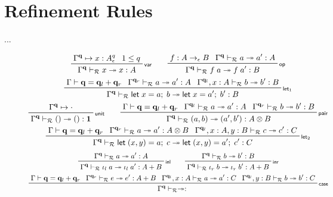 \documentclass[acmsmall,screen,review]{acmart}
\newcommand{\mc}[1]{\ensuremath{\mathcal{#1}}}
\newcommand{\mb}[1]{\ensuremath{\mathbf{#1}}}
\newcommand{\ms}[1]{\ensuremath{\mathsf{#1}}}
\newcommand{\linl}[1]{\iota_l\;{#1}}
\newcommand{\linr}[1]{\iota_r\;{#1}}
\newcommand{\letexpr}[3]{\ensuremath{\ms{let}\;#1 = #2;\;#3}}
\newcommand{\qsp}[4]{#1 \vdash #2 = #3 + #4}
\newcommand{\cwk}[2]{#1 \mapsto #2}
\newcommand{\rle}[1]{{\scriptsize\textsf{#1}}}
\newcommand{\tref}{\twoheadrightarrow}
\newcommand{\tmle}[5]{#1 \vdash_{#2} #3 \tref #4 : {#5}}
\begin{document}
\clearpage 

\appendix

\section{Refinement Rules}

...

\begin{figure}
  \begin{gather*}
    \prftree[r]{\rle{var}}
      {\cwk{\Gamma^{\mb{q}}}{x : A^q_\epsilon}}
      {1 \leq q}
      {\tmle{\Gamma^{\mb{q}}}{\mc{R}}{x}{x}{A}} \qquad
    \prftree[r]{\rle{op}}
      {f : A \to_\epsilon B}
      {\tmle{\Gamma^{\mb{q}}}{\mc{R}}{a}{a'}{A}}
      {\tmle{\Gamma^{\mb{q}}}{\mc{R}}{f\;a}{f\;a'}{B}} \\
    \prftree[r]{\rle{let$_1$}}
      {\qsp{\Gamma}{\mb{q}}{\mb{q}_l}{\mb{q}_r}}
      {\tmle{\Gamma^{\mb{q}_r}}{\mc{R}}{a}{a'}{A}}
      {\tmle{\Gamma^{\mb{q}_l}, x : A}{\mc{R}}{b}{b'}{B}}
      {\tmle{\Gamma^{\mb{q}}}{\mc{R}}{\letexpr{x}{a}{b}}{\letexpr{x}{a'}{b'}}{B}} \\
    \prftree[r]{\rle{unit}}
      {\cwk{\Gamma^{\mb{q}}}{\cdot}}
      {\tmle{\Gamma^{\mb{q}}}{\mc{R}}{()}{()}{\mb{1}}} \qquad
    \prftree[r]{\rle{pair}}
      {\qsp{\Gamma}{\mb{q}}{\mb{q}_l}{\mb{q}_r}}
      {\tmle{\Gamma^{\mb{q}_l}}{\mc{R}}{a}{a'}{A}}
      {\tmle{\Gamma^{\mb{q}_r}}{\mc{R}}{b}{b'}{B}}
      {\tmle{\Gamma^{\mb{q}}}{\mc{R}}{(a, b)}{(a', b')}{A \otimes B}} \\
    \prftree[r]{\rle{let$_2$}}
      {\qsp{\Gamma}{\mb{q}}{\mb{q}_l}{\mb{q}_r}}
      {\tmle{\Gamma^{\mb{q}_r}}{\mc{R}}{a}{a'}{A \otimes B}}
      {\tmle{\Gamma^{\mb{q}_l}, x : A, y : B}{\mc{R}}{c}{c'}{C}}
      {\tmle{\Gamma^{\mb{q}}}{\mc{R}}{\letexpr{(x, y)}{a}{c}}{\letexpr{(x, y)}{a'}{c'}}{C}}
  \end{gather*}
  \begin{gather*}
    \prftree[r]{\rle{inl}}
      {\tmle{\Gamma^{\mb{q}}}{\mc{R}}{a}{a'}{A}}
      {\tmle{\Gamma^{\mb{q}}}{\mc{R}}{\linl{a}}{\linl{a'}}{A + B}} \qquad
    \prftree[r]{\rle{inr}}
      {\tmle{\Gamma^{\mb{q}}}{\mc{R}}{b}{b'}{B}}
      {\tmle{\Gamma^{\mb{q}}}{\mc{R}}{\linr{b}}{\linr{b'}}{A + B}} \\
    \prftree[r]{\rle{case}}
      {\qsp{\Gamma}{\mb{q}}{\mb{q}_l}{\mb{q}_r}}
      {\tmle{\Gamma^{\mb{q}_r}}{\mc{R}}{e}{e'}{A + B}}
      {\tmle{\Gamma^{\mb{q}_l}, x : A}{\mc{R}}{a}{a'}{C}}
      {\tmle{\Gamma^{\mb{q}_l}, y : B}{\mc{R}}{b}{b'}{C}}
      {\tmle{\Gamma^{\mb{q}}}{\mc{R}}
}
\end{gather*}
\end{figure}
\end{document}

